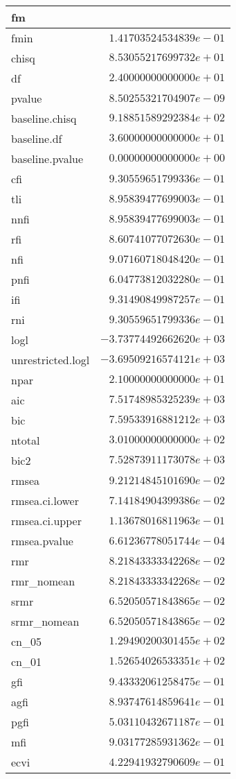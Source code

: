 %
\begin{table}[!tbp]
\begin{center}
\begin{tabular}{lr}
\hline\hline
\multicolumn{1}{l}{fm}&\multicolumn{1}{c}{}\tabularnewline
\hline
fmin&$ 1.41703524534839e-01$\tabularnewline
chisq&$ 8.53055217699732e+01$\tabularnewline
df&$ 2.40000000000000e+01$\tabularnewline
pvalue&$ 8.50255321704907e-09$\tabularnewline
baseline.chisq&$ 9.18851589292384e+02$\tabularnewline
baseline.df&$ 3.60000000000000e+01$\tabularnewline
baseline.pvalue&$ 0.00000000000000e+00$\tabularnewline
cfi&$ 9.30559651799336e-01$\tabularnewline
tli&$ 8.95839477699003e-01$\tabularnewline
nnfi&$ 8.95839477699003e-01$\tabularnewline
rfi&$ 8.60741077072630e-01$\tabularnewline
nfi&$ 9.07160718048420e-01$\tabularnewline
pnfi&$ 6.04773812032280e-01$\tabularnewline
ifi&$ 9.31490849987257e-01$\tabularnewline
rni&$ 9.30559651799336e-01$\tabularnewline
logl&$-3.73774492662620e+03$\tabularnewline
unrestricted.logl&$-3.69509216574121e+03$\tabularnewline
npar&$ 2.10000000000000e+01$\tabularnewline
aic&$ 7.51748985325239e+03$\tabularnewline
bic&$ 7.59533916881212e+03$\tabularnewline
ntotal&$ 3.01000000000000e+02$\tabularnewline
bic2&$ 7.52873911173078e+03$\tabularnewline
rmsea&$ 9.21214845101690e-02$\tabularnewline
rmsea.ci.lower&$ 7.14184904399386e-02$\tabularnewline
rmsea.ci.upper&$ 1.13678016811963e-01$\tabularnewline
rmsea.pvalue&$ 6.61236778051744e-04$\tabularnewline
rmr&$ 8.21843333342268e-02$\tabularnewline
rmr_nomean&$ 8.21843333342268e-02$\tabularnewline
srmr&$ 6.52050571843865e-02$\tabularnewline
srmr_nomean&$ 6.52050571843865e-02$\tabularnewline
cn_05&$ 1.29490200301455e+02$\tabularnewline
cn_01&$ 1.52654026533351e+02$\tabularnewline
gfi&$ 9.43332061258475e-01$\tabularnewline
agfi&$ 8.93747614859641e-01$\tabularnewline
pgfi&$ 5.03110432671187e-01$\tabularnewline
mfi&$ 9.03177285931362e-01$\tabularnewline
ecvi&$ 4.22941932790609e-01$\tabularnewline
\hline
\end{tabular}
\end{center}
\end{table}

